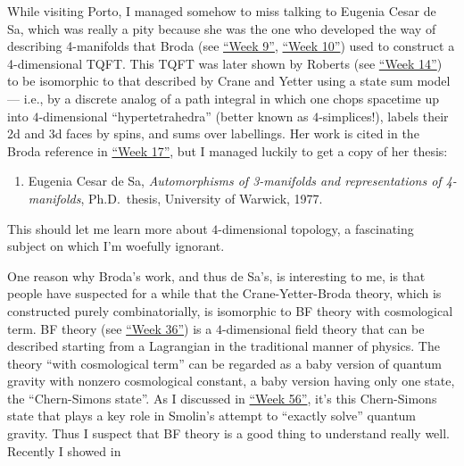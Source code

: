 \documentclass{article}
\def\tightlist{}
\renewcommand{\texttt}[1]{%
  \begingroup
  \ttfamily
  \begingroup\lccode`~=`/\lowercase{\endgroup\def~}{/\discretionary{}{}{}}%
  \begingroup\lccode`~=`[\lowercase{\endgroup\def~}{[\discretionary{}{}{}}%
  \begingroup\lccode`~=`.\lowercase{\endgroup\def~}{.\discretionary{}{}{}}%
  \catcode`/=\active\catcode`[=\active\catcode`.=\active
  \scantokens{#1\noexpand}%
  \endgroup
}
\begin{document}
While visiting Porto, I managed somehow to miss talking to Eugenia Cesar
de Sa, which was really a pity because she was the one who developed the
way of describing 4-manifolds that Broda (see
\protect\hyperlink{week9}{``Week 9''}, \protect\hyperlink{week10}{``Week
10''}) used to construct a 4-dimensional TQFT. This TQFT was later shown
by Roberts (see \protect\hyperlink{week14}{``Week 14''}) to be
isomorphic to that described by Crane and Yetter using a state sum model
--- i.e., by a discrete analog of a path integral in which one chops
spacetime up into \(4\)-dimensional ``hypertetrahedra'' (better known as
\(4\)-simplices!), labels their 2d and 3d faces by spins, and sums over
labellings. Her work is cited in the Broda reference in
\protect\hyperlink{week17}{``Week 17''}, but I managed luckily to get a
copy of her thesis:

\begin{enumerate}
\def\labelenumi{\arabic{enumi})}
\setcounter{enumi}{3}
\tightlist
\item
  Eugenia Cesar de Sa, \emph{Automorphisms of 3-manifolds and
  representations of 4-manifolds}, Ph.D.~thesis, University of Warwick,
  1977.
\end{enumerate}

This should let me learn more about \(4\)-dimensional topology, a
fascinating subject on which I'm woefully ignorant.

One reason why Broda's work, and thus de Sa's, is interesting to me, is
that people have suspected for a while that the Crane-Yetter-Broda
theory, which is constructed purely combinatorially, is isomorphic to BF
theory with cosmological term. BF theory (see
\protect\hyperlink{week36}{``Week 36''}) is a \(4\)-dimensional field
theory that can be described starting from a Lagrangian in the
traditional manner of physics. The theory ``with cosmological term'' can
be regarded as a baby version of quantum gravity with nonzero
cosmological constant, a baby version having only one state, the
``Chern-Simons state''. As I discussed in
\protect\hyperlink{week56}{``Week 56''}, it's this Chern-Simons state
that plays a key role in Smolin's attempt to ``exactly solve'' quantum
gravity. Thus I suspect that BF theory is a good thing to understand
really well. Recently I showed in

\end{document}
